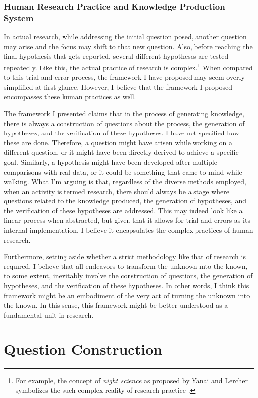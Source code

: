 \subsubsection{Human Research Practice and Knowledge Production System}
In actual research, while addressing the initial question posed, another question may arise and the focus may shift to that new question. Also, before reaching the final hypothesis that gets reported, several different hypotheses are tested repeatedly. Like this, the actual practice of research is complex.\footnote{
For example, the concept of \textit{night science} as proposed by Yanai and Lercher symbolizes the such complex reality of research practice \cite{yanai2019night}.
} When compared to this trial-and-error process, the framework I have proposed may seem overly simplified at first glance. However, I believe that the framework I proposed encompasses these human practices as well.

The framework I presented claims that in the process of generating knowledge, there is always a construction of questions about the process, the generation of hypotheses, and the verification of these hypotheses. I have not specified how these are done. Therefore, a question might have arisen while working on a different question, or it might have been directly derived to achieve a specific goal. Similarly, a hypothesis might have been developed after multiple comparisons with real data, or it could be something that came to mind while walking. What I'm arguing is that, regardless of the diverse methods employed, when an activity is termed research, there should always be a stage where questions related to the knowledge produced, the generation of hypotheses, and the verification of these hypotheses are addressed. This may indeed look like a linear process when abstracted, but given that it allows for trial-and-errors as its internal implementation, I believe it encapsulates the complex practices of human research.

Furthermore, setting aside whether a strict methodology like that of research is required, I believe that all endeavors to transform the unknown into the known, to some extent, inevitably involve the construction of questions, the generation of hypotheses, and the verification of these hypotheses. In other words, I think this framework might be an embodiment of the very act of turning the unknown into the known. In this sense, this framework might be better understood as a fundamental unit in research.

\section{Question Construction}


